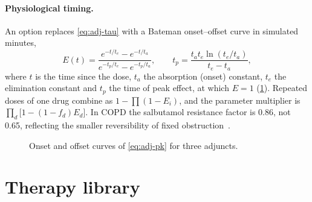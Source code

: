 \paragraph{Physiological timing.} An option replaces \cref{eq:adj-tau} with a Bateman onset--offset curve in simulated minutes,
\begin{equation}
E(t)=\frac{e^{-t/t_e}-e^{-t/t_a}}{e^{-t_p/t_e}-e^{-t_p/t_a}},\qquad
t_p=\frac{t_a t_e\ln(t_e/t_a)}{t_e-t_a},
\label{eq:adj-pk}
\end{equation}
where $t$ is the time since the dose, $t_a$ the absorption (onset) constant, $t_e$ the elimination constant and $t_p$ the time of peak effect, at which $E=1$ (\cref{fig:adj-pk}). Repeated doses of one drug combine as $1-\prod(1-E_i)$, and the parameter multiplier is $\prod_d\bigl[1-(1-f_d)E_d\bigr]$. In COPD the salbutamol resistance factor is 0.86, not 0.65, reflecting the smaller reversibility of fixed obstruction~\citep{calverley2003}.

\begin{figure}[htbp]\centering
{}
\caption{Onset and offset curves of \cref{eq:adj-pk} for three adjuncts.}
\label{fig:adj-pk}
\end{figure}

\section{Therapy library}
\label{sec:adj-lib}

